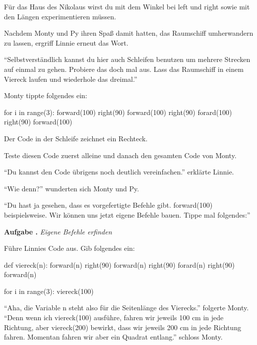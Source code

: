 \documentclass[a5paper,12pt,twoside,openright]{scrbook}
\newlength{\aufgabenskip}
\newcounter{aufgabennummer}
\newenvironment{aufgabeUnshaded}[1]{
  \refstepcounter{aufgabennummer}
  \textbf{Aufgabe \theaufgabennummer.} \emph{#1} \par
}{\vspace{\aufgabenskip}}
\begin{document}
 \begin{lip}{}
 Für das Haus des Nikolaus wirst du mit dem Winkel bei left und right sowie mit den Längen experimentieren müssen.
 \end{lip}

Nachdem Monty und Py ihren Spa{\ss} damit hatten, das Raumschiff umherwandern zu lassen, ergriff Linnie erneut das Wort. 

"`Selbstverständlich kannst du hier auch Schleifen benutzen um mehrere Strecken auf einmal zu gehen.
  Probiere das doch mal aus. Lass das Raumschiff in einem Viereck laufen und wiederhole das dreimal."'
  
Monty tippte folgendes ein:  
\begin{pythoncode}
for i in range(3):
   forward(100) 
   right(90)
   forward(100)
   right(90)
   forard(100)
   right(90)
   forward(100)
\end{pythoncode}


\begin{lip}{}
 Der Code in der Schleife zeichnet ein Rechteck. 
 
 Teste diesen Code zuerst alleine und danach den gesamten Code von Monty.
\end{lip}


``Du kannst den Code übrigens noch deutlich vereinfachen.'' erklärte Linnie.

``Wie denn?'' wunderten sich Monty und Py.

``Du hast ja gesehen, dass es vorgefertigte Befehle gibt. forward(100) beispielsweise.
Wir können uns jetzt eigene Befehle bauen. Tippe mal folgendes:''

\begin{aufgabeUnshaded}{Eigene Befehle erfinden}
 Führe Linnies Code aus. Gib folgendes ein:
\begin{pythoncode}
def viereck(n):
    forward(n) 
    right(90)
    forward(n)
    right(90)
    forard(n)
    right(90)
    forward(n) 
    
for i in range(3):
    viereck(100)  
\end{pythoncode}
\end{aufgabeUnshaded}

``Aha, die Variable n steht also für die Seitenlänge des Vierecks.'' folgerte Monty.
``Denn wenn ich viereck(100) ausführe, fahren wir jeweils 100 cm in jede Richtung, 
aber viereck(200) bewirkt, dass wir jeweils 200 cm in jede Richtung fahren.
Momentan fahren wir aber ein Quadrat entlang.''
schloss Monty.
\end{document}
